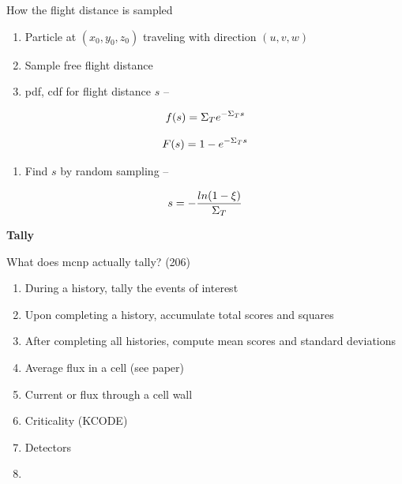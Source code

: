 \documentclass[aspectratio=1610,pdftex,dvipsnames,compress,xcolor={dvipsnames}]{beamer}
\newcommand{\acsp}{\acrshortpl} %
\begin{document}
\begin{frame}{How the flight distance is sampled}
    \begin{enumerate}[series=outerlist,topsep=0pt,itemsep=21pt,leftmargin=*,label=(\arabic*)]
        \item[]Particle at $(x_0,y_0,z_0)$ traveling with direction $(u,v,w)$
        \item[]Sample free flight distance
        \item[]pdf, cdf for flight distance $s$ --
    \end{enumerate}

    \vspace*{\fill}

    \begin{equation}
        \LARGE
        f(s) = \Sigma_T e^{-\Sigma_T s}
    \end{equation}

    \begin{equation}
        \LARGE
        F(s) = 1 - e^{-\Sigma_T s}
    \end{equation}

    \vspace*{\fill}

    \begin{enumerate}[series=outerlist,topsep=0pt,itemsep=21pt,leftmargin=*,label=(\arabic*)]
        \item[]Find $s$ by random sampling --
    \end{enumerate}

    \vspace*{\fill}

    \begin{equation}
        \LARGE
        s = -\frac{ln(1 - \xi)}{\Sigma_T}
    \end{equation}
\end{frame}


\begin{frame}[plain]{}
    \centering\LARGE\textbf{Tally}
\end{frame}


\addtocounter{framenumber}{-1} 
\begin{frame}{What does mcnp actually tally? (206)}
    \begin{enumerate}[series=outerlist,topsep=0pt,itemsep=17pt,leftmargin=*,label=(\arabic*)]
        \item[]During a history, tally the events of interest
        \item[]Upon completing a history, accumulate total scores and squares
        \item[]After completing all histories, compute mean scores and standard deviations
        \item[]Average flux in a cell (see paper)
        \item[]Current or flux through a cell wall
        \item[]Criticality (KCODE)
        \item[]Detectors
        \item[]\acsp{rtg}
    \end{enumerate}
\end{frame}
\end{document}
